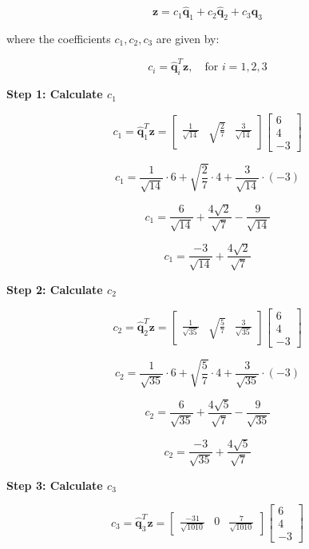 \documentclass{article}
\begin{document}
\[
\mathbf{z} = c_1 \hat{\mathbf{q}}_1 + c_2 \hat{\mathbf{q}}_2 + c_3 \hat{\mathbf{q}}_3
\]

where the coefficients \(c_1, c_2, c_3\) are given by:

\[
c_i = \hat{\mathbf{q}}_i^T \mathbf{z}, \quad \text{for } i = 1, 2, 3
\]

\textbf{Step 1: Calculate \(c_1\)}

\[
c_1 = \hat{\mathbf{q}}_1^T \mathbf{z} = \begin{bmatrix} \frac{1}{\sqrt{14}} & \sqrt{\frac{2}{7}} & \frac{3}{\sqrt{14}} \end{bmatrix} \begin{bmatrix} 6 \\ 4 \\ -3 \end{bmatrix}
\]

\[
c_1 = \frac{1}{\sqrt{14}} \cdot 6 + \sqrt{\frac{2}{7}} \cdot 4 + \frac{3}{\sqrt{14}} \cdot (-3)
\]

\[
c_1 = \frac{6}{\sqrt{14}} + \frac{4\sqrt{2}}{\sqrt{7}} - \frac{9}{\sqrt{14}}
\]

\[
c_1 = \frac{-3}{\sqrt{14}} + \frac{4\sqrt{2}}{\sqrt{7}}
\]

\textbf{Step 2: Calculate \(c_2\)}

\[
c_2 = \hat{\mathbf{q}}_2^T \mathbf{z} = \begin{bmatrix} \frac{1}{\sqrt{35}} & \sqrt{\frac{5}{7}} & \frac{3}{\sqrt{35}} \end{bmatrix} \begin{bmatrix} 6 \\ 4 \\ -3 \end{bmatrix}
\]

\[
c_2 = \frac{1}{\sqrt{35}} \cdot 6 + \sqrt{\frac{5}{7}} \cdot 4 + \frac{3}{\sqrt{35}} \cdot (-3)
\]

\[
c_2 = \frac{6}{\sqrt{35}} + \frac{4\sqrt{5}}{\sqrt{7}} - \frac{9}{\sqrt{35}}
\]

\[
c_2 = \frac{-3}{\sqrt{35}} + \frac{4\sqrt{5}}{\sqrt{7}}
\]

\textbf{Step 3: Calculate \(c_3\)}

\[
c_3 = \hat{\mathbf{q}}_3^T \mathbf{z} = \begin{bmatrix} \frac{-31}{\sqrt{1010}} & 0 & \frac{7}{\sqrt{1010}} \end{bmatrix} \begin{bmatrix} 6 \\ 4 \\ -3 \end{bmatrix}
\]
\end{document}
